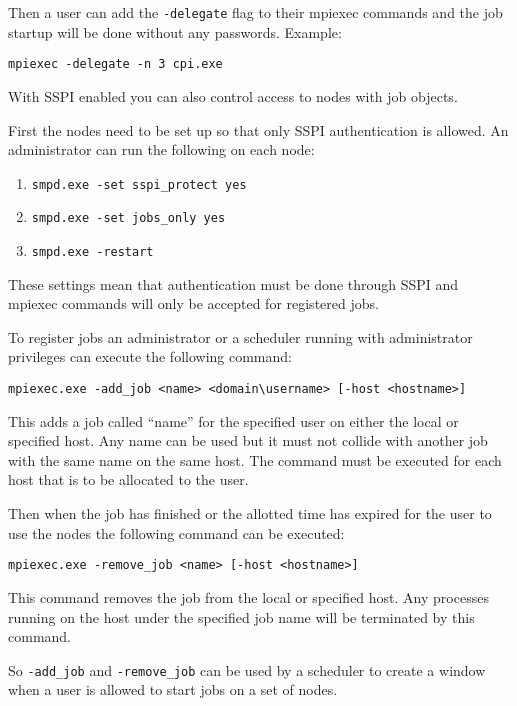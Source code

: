 \documentclass[dvipdfm,11pt]{article}
\begin{document}
Then a user can add the \texttt{-delegate} flag to their mpiexec commands and the job startup 
will be done without any passwords.  Example:
\begin{verbatim}
mpiexec -delegate -n 3 cpi.exe
\end{verbatim}

With SSPI enabled you can also control access to nodes with job objects.

First the nodes need to be set up so that only SSPI authentication is allowed.  An administrator
can run the following on each node:
\begin{enumerate}
\item \texttt{smpd.exe -set sspi\_protect yes}
\item \texttt{smpd.exe -set jobs\_only yes}
\item \texttt{smpd.exe -restart}
\end{enumerate}

These settings mean that authentication must be done through SSPI and mpiexec commands will only be
accepted for registered jobs.

To register jobs an administrator or a scheduler running with administrator privileges can execute
the following command:
\begin{verbatim}
mpiexec.exe -add_job <name> <domain\username> [-host <hostname>]
\end{verbatim}
This adds a job called ``name'' for the specified user on either the local or specified host.  Any
name can be used but it must not collide with another job with the same name on the same host.  The
command must be executed for each host that is to be allocated to the user.

Then when the job has finished or the allotted time has expired for the user to use the nodes the 
following command can be executed:
\begin{verbatim}
mpiexec.exe -remove_job <name> [-host <hostname>]
\end{verbatim}
This command removes the job from the local or specified host.  Any processes running on the host 
under the specified job name will be terminated by this command.

So \texttt{-add\_job} and \texttt{-remove\_job} can be used by a scheduler to create a window when a user is allowed to
start jobs on a set of nodes.
\end{document}
